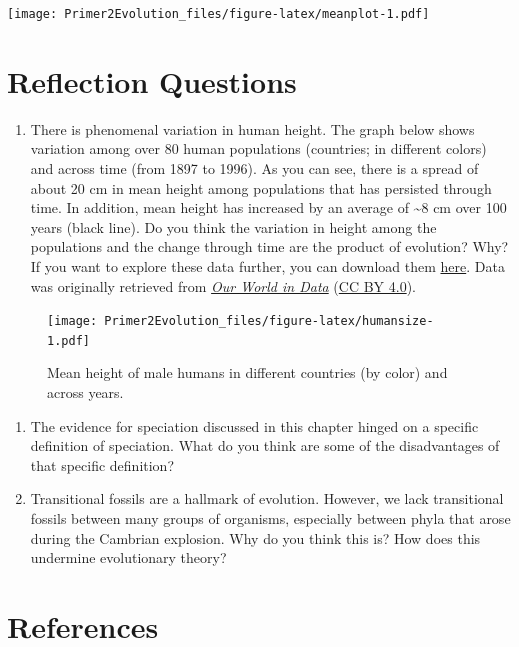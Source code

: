 \documentclass[
]{book}
\providecommand{\tightlist}{%
  \setlength{\itemsep}{0pt}\setlength{\parskip}{0pt}}
\begin{document}
\texttt{[image: Primer2Evolution\_files/figure-latex/meanplot-1.pdf]}

\hypertarget{reflection-questions-1}{%
\section{Reflection Questions}\label{reflection-questions-1}}

\begin{enumerate}
\def\labelenumi{\arabic{enumi}.}
\tightlist
\item
  There is phenomenal variation in human height. The graph below shows variation among over 80 human populations (countries; in different colors) and across time (from 1897 to 1996). As you can see, there is a spread of about 20 cm in mean height among populations that has persisted through time. In addition, mean height has increased by an average of \textasciitilde8 cm over 100 years (black line). Do you think the variation in height among the populations and the change through time are the product of evolution? Why? If you want to explore these data further, you can download them \href{data/human_height.csv}{here}. Data was originally retrieved from \href{https://ourworldindata.org/human-height}{\emph{Our World in Data}} (\href{https://creativecommons.org/licenses/by/4.0/}{CC BY 4.0}).
\end{enumerate}

\begin{figure}
\centering
\texttt{[image: Primer2Evolution\_files/figure-latex/humansize-1.pdf]}
\caption{\label{fig:humansize}Mean height of male humans in different countries (by color) and across years.}
\end{figure}

\begin{enumerate}
\def\labelenumi{\arabic{enumi}.}
\setcounter{enumi}{1}
\tightlist
\item
  The evidence for speciation discussed in this chapter hinged on a specific definition of speciation. What do you think are some of the disadvantages of that specific definition?
\item
  Transitional fossils are a hallmark of evolution. However, we lack transitional fossils between many groups of organisms, especially between phyla that arose during the Cambrian explosion. Why do you think this is? How does this undermine evolutionary theory?
\end{enumerate}

\hypertarget{references-2}{%
\section{References}\label{references-2}}
\end{document}
